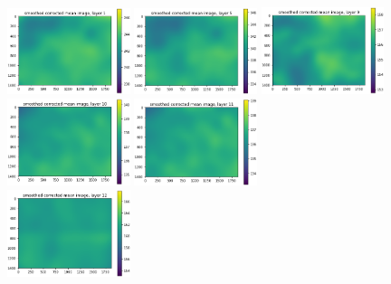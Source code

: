 \documentclass[letterpaper,11pt]{article}
\begin{document}
\begin{figure}[!ht]
\centering
\includegraphics[width=0.32\textwidth]{images/results/smoothed_corrected_mean_image_layers_polaris/smoothed_corrected_mean_image_layer_1_same_scale}
\includegraphics[width=0.32\textwidth]{images/results/smoothed_corrected_mean_image_layers_polaris/smoothed_corrected_mean_image_layer_5_same_scale}
\includegraphics[width=0.32\textwidth]{images/results/smoothed_corrected_mean_image_layers_polaris/smoothed_corrected_mean_image_layer_9_same_scale}
\includegraphics[width=0.32\textwidth]{images/results/smoothed_corrected_mean_image_layers_polaris/smoothed_corrected_mean_image_layer_10_same_scale}
\includegraphics[width=0.32\textwidth]{images/results/smoothed_corrected_mean_image_layers_polaris/smoothed_corrected_mean_image_layer_11_same_scale} \\
\includegraphics[width=0.32\textwidth]{images/results/smoothed_corrected_mean_image_layers_polaris/smoothed_corrected_mean_image_layer_12_same_scale}

\end{figure}
\end{document}
